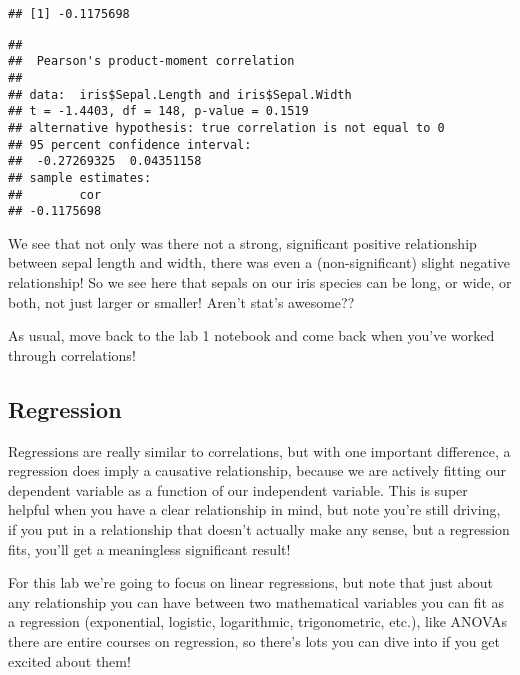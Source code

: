 \documentclass[
]{article}
\newenvironment{Shaded}{\begin{snugshade}}{\end{snugshade}}
\newcommand{\KeywordTok}[1]{\textcolor[rgb]{0.13,0.29,0.53}{\textbf{#1}}}
\newcommand{\NormalTok}[1]{#1}
\newcommand{\OperatorTok}[1]{\textcolor[rgb]{0.81,0.36,0.00}{\textbf{#1}}}
\begin{document}
\begin{verbatim}
## [1] -0.1175698
\end{verbatim}

\begin{Shaded}
\end{Shaded}

\begin{verbatim}
## 
##  Pearson's product-moment correlation
## 
## data:  iris$Sepal.Length and iris$Sepal.Width
## t = -1.4403, df = 148, p-value = 0.1519
## alternative hypothesis: true correlation is not equal to 0
## 95 percent confidence interval:
##  -0.27269325  0.04351158
## sample estimates:
##        cor 
## -0.1175698
\end{verbatim}

We see that not only was there not a strong, significant positive
relationship between sepal length and width, there was even a
(non-significant) slight negative relationship! So we see here that
sepals on our iris species can be long, or wide, or both, not just
larger or smaller! Aren't stat's awesome??

As usual, move back to the lab 1 notebook and come back when you've
worked through correlations!

\hypertarget{regression}{%
\subsection{Regression}\label{regression}}

Regressions are really similar to correlations, but with one important
difference, a regression does imply a causative relationship, because we
are actively fitting our dependent variable as a function of our
independent variable. This is super helpful when you have a clear
relationship in mind, but note you're still driving, if you put in a
relationship that doesn't actually make any sense, but a regression
fits, you'll get a meaningless significant result!

For this lab we're going to focus on linear regressions, but note that
just about any relationship you can have between two mathematical
variables you can fit as a regression (exponential, logistic,
logarithmic, trigonometric, etc.), like ANOVAs there are entire courses
on regression, so there's lots you can dive into if you get excited
about them!
\end{document}
